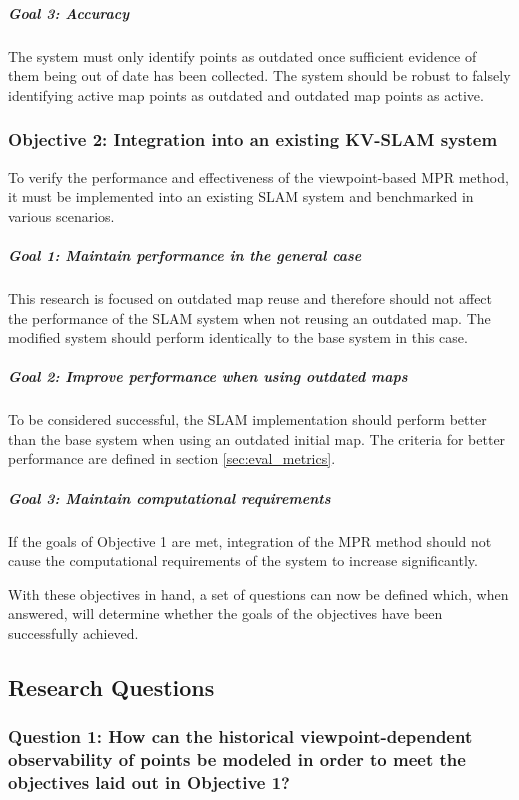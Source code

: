\subparagraph{Goal 3: Accuracy}

The system must only identify points as outdated once sufficient evidence of them being out of date has been collected. The system should be robust to falsely identifying active map points as outdated and outdated map points as active.

\subsubsection*{Objective 2: Integration into an existing KV-SLAM system}

To verify the performance and effectiveness of the viewpoint-based MPR method, it must be implemented into an existing SLAM system and benchmarked in various scenarios.

\subparagraph{Goal 1: Maintain performance in the general case}

This research is focused on outdated map reuse and therefore should not affect the performance of the SLAM system when not reusing an outdated map. The modified system should perform identically to the base system in this case.

\subparagraph{Goal 2: Improve performance when using outdated maps}

To be considered successful, the SLAM implementation should perform better than the base system when using an outdated initial map. The criteria for better performance are defined in section \ref{sec:eval_metrics}.

\subparagraph{Goal 3: Maintain computational requirements}

If the goals of Objective 1 are met, integration of the MPR method should not cause the computational requirements of the system to increase significantly.

\bigskip
\noindent With these objectives in hand, a set of questions can now be defined which, when answered, will determine whether the goals of the objectives have been successfully achieved.

\subsection{Research Questions}
\label{sec:research_questions}
\subsubsection*{Question 1: How can the historical viewpoint-dependent observability of points be modeled in order to meet the objectives laid out in Objective 1?}

